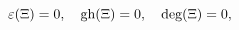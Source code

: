 \begin{equation}\label{6.3}
\varepsilon(\Xi)=0,\quad\hbox{gh}(\Xi)=0,\quad\hbox{deg}(\Xi)=0,
\end{equation}

